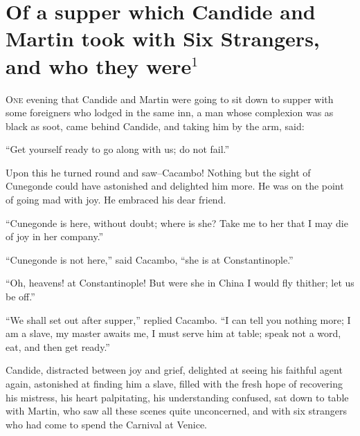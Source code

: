 \chapter[chapter 26]{Of a supper which Candide and Martin took with Six Strangers, and who they were$^1$}
\thispagestyle{pter}
\vspace{-1cm}
\lettrine[lraise=0.1,nindent=0em,slope=-.5em]{O}{ne} evening that Candide and Martin were going to sit down to supper with some foreigners who lodged in the same inn, a man whose complexion was as black as soot, came behind Candide, and taking him by the arm, said:

``Get yourself ready to go along with us; do not fail.''

Upon this he turned round and saw--Cacambo! Nothing but the sight of Cunegonde could have astonished and delighted him more. He was on the point of going mad with joy. He embraced his dear friend.

``Cunegonde is here, without doubt; where is she? Take me to her that I may die of joy in her company.''

``Cunegonde is not here,'' said Cacambo, ``she is at Constantinople.''

``Oh, heavens! at Constantinople! But were she in China I would fly thither; let us be off.''

``We shall set out after supper,'' replied Cacambo. ``I can tell you nothing more; I am a slave, my master awaits me, I must serve him at table; speak not a word, eat, and then get ready.''

Candide, distracted between joy and grief, delighted at seeing his faithful agent again, astonished at finding him a slave, filled with the fresh hope of recovering his mistress, his heart palpitating, his understanding confused, sat down to table with Martin, who saw all these scenes quite unconcerned, and with six strangers who had come to spend the Carnival at Venice.

